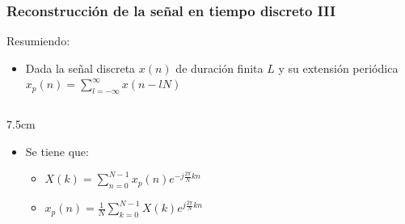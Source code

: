 

\begin{frame}
\frametitle{Reconstrucción de la señal en tiempo discreto III}

  \footnotesize
  Resumiendo:


  \begin{itemize}
    \item Dada la señal discreta $x(n)$ de duración finita $L$ y su extensión periódica $x_p(n)\!=\!\sum_{l=-\infty}^{\infty} x(n\!-\!lN)$
  \end{itemize}

  \vspace{-0.3cm}
  \vspace{-0.1cm}
  \begin{columns}[c]
    \begin{column}{7.5cm}
      \begin{itemize}
        \item Se tiene que: 

        \begin{itemize}
          \vspace{-0.2cm}
          \footnotesize
          \item ${X(k)\!=\!\sum_{n=0}^{N-1} x_p(n) e^{-j\frac{2\pi}{N}\!kn}}$

          \vspace{0.1cm}

          \item $x_p(n)=\frac{1}{N} \sum_{k=0}^{N-1} X(k) e^{j\frac{2\pi}{N}kn}$
        \end{itemize}
\end{itemize}
\end{column}
\end{columns}
\end{frame}
